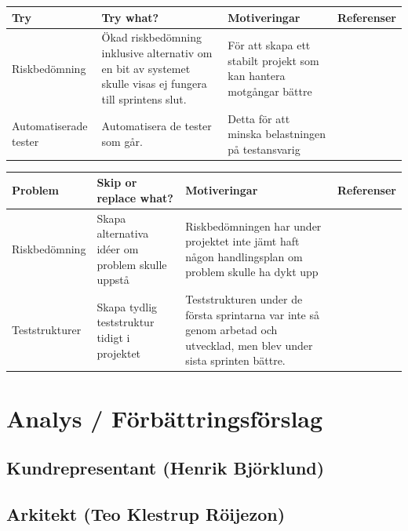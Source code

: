 \documentclass[conference,a4paper]{IEEEtran}
\newcommand\Tstrut{\rule{0pt}{2.6ex}}       %
\newcommand\Bstrut{\rule[-0.9ex]{0pt}{0pt}} %
\newcommand{\TBstrut}{\Tstrut\Bstrut} %
\begin{document}
\begin{table}[H]
	\small
  \centering
	\begin{tabular}{|p{1.9cm}|p{2cm}|p{1.7cm}|p{1.2cm}|} %
    \hline
    Try & Try what? & Motiveringar & Referenser \TBstrut \\
    \hline
    Riskbedömning & Ökad riskbedömning inklusive alternativ om en bit av systemet skulle visas ej fungera till sprintens slut. & För att skapa ett stabilt projekt som kan hantera motgångar bättre& \TBstrut \\
    \hline
    Automatiserade tester & Automatisera de tester som går. & Detta för att minska belastningen på testansvarig& \TBstrut \\
    \hline

  \end{tabular}
\end{table}

\begin{table}[H]
	\small
  \centering
	\begin{tabular}{|p{1.9cm}|p{1.7cm}|p{2.2cm}|p{1.2cm}|} %
    \hline
    Problem & Skip or replace what? & Motiveringar & Referenser \TBstrut \\
    \hline
    Riskbedömning & Skapa alternativa idéer om problem skulle uppstå &  Riskbedömningen har under projektet inte jämt haft någon handlingsplan om problem skulle ha dykt upp& \TBstrut \\
    \hline
    Teststrukturer &Skapa tydlig teststruktur tidigt i projektet &Teststrukturen under de första sprintarna var inte så genom arbetad och utvecklad, men blev under sista sprinten bättre.  & \TBstrut \\
    \hline

  \end{tabular}
\end{table}

\section{Analys / Förbättringsförslag} \label{sec:analys}

\subsection{Kundrepresentant (Henrik Björklund)}

\subsection{Arkitekt (Teo Klestrup Röijezon)}
\end{document}
